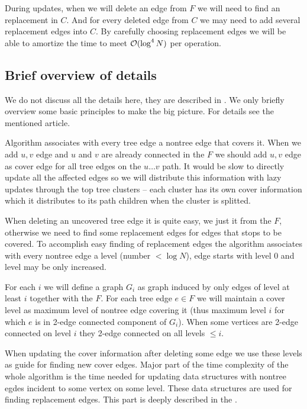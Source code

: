 During updates, when we will delete an edge from $F$ we will need to find an
replacement in $C$. And for every deleted edge from $C$ we may need to add
several replacement edges into $C$. By carefully choosing replacement
edges we will be able to amortize the time to meet ${\cal O}(\log^4 N)$ per operation.

\subsection{Brief overview of details}

We do not discuss all the details here, they are described in \cite{PolylogarithmicAlgorithmsForConnectivity}. We only briefly overview some basic
principles to make the big picture. For details see the mentioned article.

Algorithm associates with every tree edge a nontree edge that covers it. When we
add $u,v$ edge and $u$ and $v$ are already connected in the $F$ we should add
$u,v$ edge as cover edge for all tree edges on the $u\dots v$ path. It would be
slow to directly update all the affected edges so we will distribute this
information with lazy updates through the top tree clusters -- each cluster has
its own cover information which it distributes to its path children when the
cluster is splitted.

When deleting an uncovered tree edge it is quite easy, we just \Cut{} it from
the $F$, otherwise we need to find some replacement edges for edges that stops
to be covered. To accomplish easy finding of replacement edges the algorithm
associates with every nontree edge a level (number $< \log N$), edge starts with
level 0 and level may be only increased.

For each $i$ we will define a graph $G_i$ as graph induced by only edges of
level at least $i$ together with the $F$. For each tree edge $e \in F$ we will
maintain a cover level as maximum level of nontree edge covering it (thus
maximum level $i$ for which $e$ is in 2-edge connected component of $G_i$). When
some vertices are 2-edge connected on level $i$ they 2-edge connected on all
levels $\le i$.

When updating the cover information after deleting some edge we use these levels
as guide for finding new cover edges. Major part of the time complexity of the
whole algorithm is the time needed for updating data structures with nontree
egdes incident to some vertex on some level. These data structures are used for
finding replacement edges. This part is deeply described in the \cite{PolylogarithmicAlgorithmsForConnectivity}.

